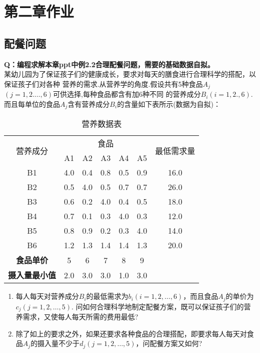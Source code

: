 \ifx\allfiles\undefined

	
	
\else
\fi
\section{第二章作业}
\subsection{配餐问题}
\textbf{Q：编程求解本章ppt中例2.2合理配餐问题，需要的基础数据自拟。}
\\某幼儿园为了保证孩子们的健康成长，要求对每天的膳食进行合理科学的搭配，以保证孩子们对各种
营养的需求.从营养学的角度.假设共有5种食品$A_j$$(j=1,2.…,6)$可供选择,每种食品都含有加6种不同
的营养成分$B_i$$(i=1,2.,6)$.而且每单位的食品$A_j$含有营养成分$B_i$的含量如下表所示(数据为自拟)：

\begin{table}[H]
    \centering
    \renewcommand{\arraystretch}{1.5}
    \begin{tabular}{|c|c|c|c|c|c|c|}
    \hline
    \multirow{2}{*}{营养成分} & \multicolumn{5}{c|}{食品} & \multirow{2}{*}{最低需求量} \\ \cline{2-6} 
     & A1 & A2 & A3 & A4 & A5 & \\ \hline
    B1 & 4.0 & 0.4 & 0.8 & 0.5 & 0.9 & 16.0 \\ \hline
    B2 & 0.5 & 4.0 & 0.5 & 0.7 & 0.7 & 26.0 \\ \hline
    B3 & 0.6 & 0.2 & 4.0 & 0.4 & 0.5 & 18.0 \\ \hline
    B4 & 0.7 & 0.1 & 0.3 & 4.0 & 0.3 & 12.0 \\ \hline
    B5 & 0.8 & 0.9 & 0.2 & 0.3 & 4.0 & 14.0 \\ \hline
    B6 & 1.2 & 1.3 & 1.4 & 1.4 & 1.3 & 20.0 \\ \hline
    \textbf{食品单价} & 5 & 6 & 7 & 8 & 9 & \\ \hline
    \textbf{摄入量最小值} & 2.0 & 3.0 & 3.0 & 1.0 & 3.0 & \\ \hline
    \end{tabular}
    \caption{营养数据表}
\end{table}

\begin{enumerate}
    \item 每人每天对营养成分$B_i$的最低需求为$b_i(i=1,2,\dots,6)$，而且食品$A_j$的单价为$c_j(j=1,2,\dots,5)$. 问如何合理科学地制定配餐方案，既可以保证孩子们的营养需求，又使每人每天所需的费用最低?
    \item 除了如上的要求之外，如果还要求各种食品的合理搭配，即要求每人每天对食品$A_j$的摄入量不少于$d_j(j=1,2,\dots,5)$，问配餐方案又如何?
\end{enumerate}

